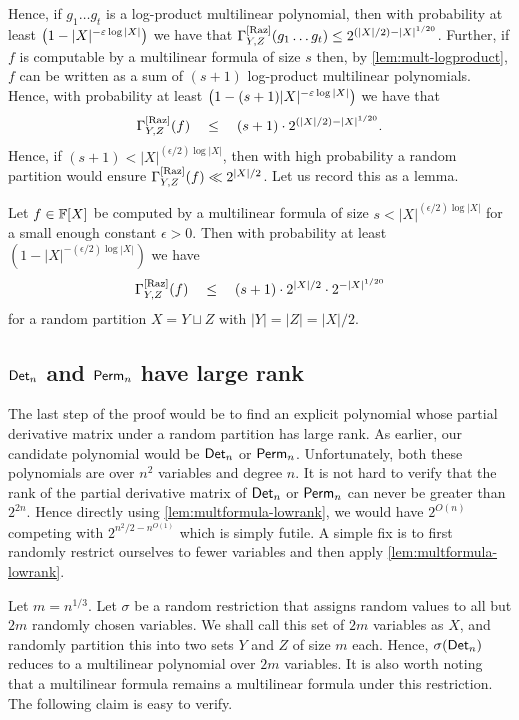 \begin{sloppy}
	Hence, if $g_1\dots g_t$ is a log-product multilinear polynomial, 
	then with probability at least $\left(1 - |X|^{-\varepsilon \log |X|}\right)$ 
	we have that $\Gamma^{\mathrm{[Raz]}}_{Y,Z}(g_1\dots g_t) \leq 2^{(|X|/2) - |X|^{1/20}}$. 
	Further, if $f$ is computable by a multilinear formula of size $s$ then, 
	by \autoref{lem:mult-logproduct}, $f$ can be written as a sum of 
	$(s+1)$ log-product multilinear polynomials. 
Hence, with probability 
	at least $\left(1 - (s+1)|X|^{-\varepsilon \log |X|}\right)$ we have that
		$$\Gamma^{\mathrm{[Raz]}}_{Y,Z}(f) \quad \leq \quad (s+1) \cdot 2^{(|X|/2) - |X|^{1/20}}. $$
	Hence, if $(s+1) < |X|^{(\epsilon/2) \log |X|}$, then with high 
	probability a random partition would ensure 
	$\Gamma^{\mathrm{[Raz]}}_{Y,Z}(f) \ll 2^{|X|/2}$. 
Let us record this as a lemma.
\end{sloppy}

\begin{lemma}\label{lem:multformula-lowrank}
  Let $f \in \mathbb{F}[X]$ be computed by a multilinear formula of size $s < |X|^{(\epsilon/2) \log |X|}$ for a small enough constant $\epsilon > 0$. 
Then with probability at least $(1 - |X|^{-(\epsilon/2)\log |X|})$ we have $$\Gamma^{\mathrm{[Raz]}}_{Y,Z}(f) \quad \leq \quad (s+1)\cdot 2^{|X|/2} \cdot 2^{-|X|^{1/20}}$$ for a random partition $X = Y \sqcup Z$ with $|Y| = |Z| = |X|/2$.
\end{lemma}

\subsection{$\operatorname{\mathsf{Det}}_n$ and $\operatorname{\mathsf{Perm}}_n$ have large rank}

The last step of the proof would be to find an explicit polynomial whose partial derivative matrix under a random partition has large rank. 
As earlier, our candidate polynomial would be $\operatorname{\mathsf{Det}}_n$ or $\operatorname{\mathsf{Perm}}_n$. 
Unfortunately, both these polynomials are over $n^2$ variables and degree $n$. 
It is not hard to verify that the rank of the partial derivative matrix of $\operatorname{\mathsf{Det}}_n$ or $\operatorname{\mathsf{Perm}}_n$ can never be greater than $2^{2n}$. 
Hence directly using \autoref{lem:multformula-lowrank}, we would have $2^{O(n)}$ competing with $2^{n^2/2 - n^{O(1)}}$ which is simply futile. 
A simple fix is to first randomly restrict ourselves to fewer variables and then apply \autoref{lem:multformula-lowrank}. 

Let $m = n^{1/3}$. 
Let $\sigma$ be a random restriction that assigns random values to all but $2m$ randomly chosen variables. 
We shall call this set of $2m$ variables as $X$, and randomly partition this into two sets $Y$ and $Z$ of size $m$ each. 
Hence, $\sigma(\operatorname{\mathsf{Det}}_n)$ reduces to a multilinear polynomial over $2m$ variables. 
It is also worth noting that a multilinear formula remains a multilinear formula under this restriction. 
The following claim is easy to verify. 


